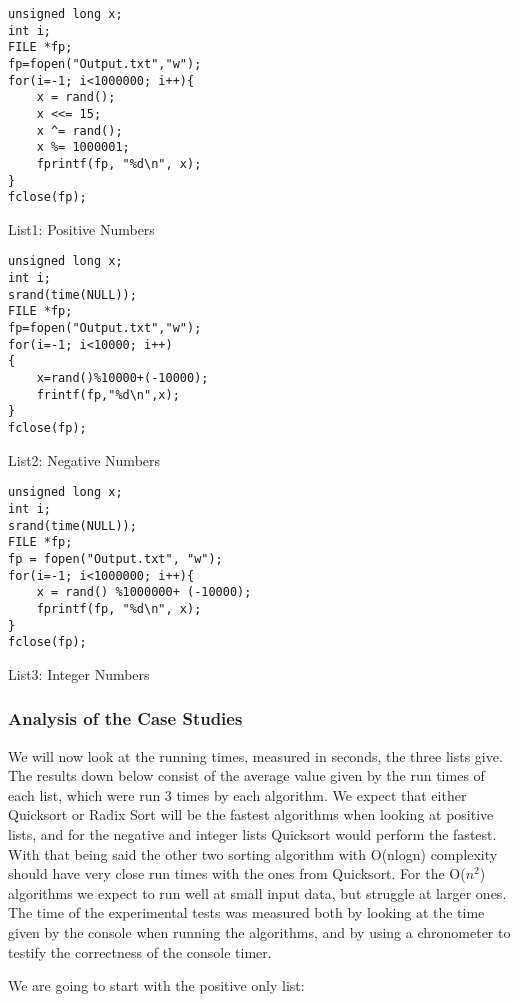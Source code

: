 \documentclass{article}
\numberwithin{figure}{section}
\begin{document}
\begin{multicols}{2}
\begin{lstlisting}[frame=none]
unsigned long x;
int i;
FILE *fp;
fp=fopen("Output.txt","w");
for(i=-1; i<1000000; i++){
    x = rand();
    x <<= 15;
    x ^= rand();
    x %= 1000001;
    fprintf(fp, "%d\n", x);
}
fclose(fp);
\end{lstlisting}
List1: Positive Numbers

\begin{lstlisting}[frame=none]
unsigned long x;
int i;
srand(time(NULL));
FILE *fp;
fp=fopen("Output.txt","w");
for(i=-1; i<10000; i++)
{
    x=rand()%10000+(-10000);
    frintf(fp,"%d\n",x);
}
fclose(fp);
\end{lstlisting}
List2: Negative Numbers
\end{multicols}

\begin{lstlisting}[frame=none]
unsigned long x;
int i;
srand(time(NULL));
FILE *fp;
fp = fopen("Output.txt", "w");
for(i=-1; i<1000000; i++){
    x = rand() %1000000+ (-10000);
    fprintf(fp, "%d\n", x);
}
fclose(fp);
\end{lstlisting}
List3: Integer Numbers

\subsubsection{Analysis of the Case Studies}

We will now look at the running times, measured in seconds, the three lists give. The results down below consist of the average value given by the run times of each list, which were run 3 times by each algorithm. We expect that either Quicksort or Radix Sort will be the fastest algorithms when looking at positive lists, and for the negative and integer lists Quicksort would perform the fastest. With that being said the other two sorting algorithm with O(nlogn) complexity should have very close run times with the ones from Quicksort. For the O(\(n^2\)) algorithms we expect to run well at small input data, but struggle at larger ones. The time of the experimental tests was measured both by looking at the time given by the console when running the algorithms, and by using a chronometer to testify the correctness of the console timer.

We are going to start with the positive only list:
\end{document}
